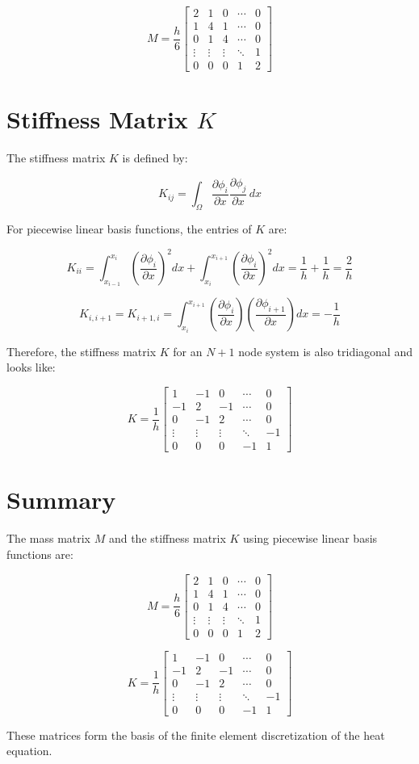 \documentclass{article}
\begin{document}
\[
M = \frac{h}{6}
\begin{bmatrix}
2 & 1 & 0 & \cdots & 0 \\
1 & 4 & 1 & \cdots & 0 \\
0 & 1 & 4 & \cdots & 0 \\
\vdots & \vdots & \vdots & \ddots & 1 \\
0 & 0 & 0 & 1 & 2
\end{bmatrix}
\]

\section*{Stiffness Matrix \(K\)}
The stiffness matrix \(K\) is defined by:

\[
K_{ij} = \int_{\Omega} \frac{\partial \phi_i}{\partial x} \frac{\partial \phi_j}{\partial x} \, dx
\]

For piecewise linear basis functions, the entries of \(K\) are:

\[
K_{ii} = \int_{x_{i-1}}^{x_i} \left( \frac{\partial \phi_i}{\partial x} \right)^2 dx + \int_{x_i}^{x_{i+1}} \left( \frac{\partial \phi_i}{\partial x} \right)^2 dx = \frac{1}{h} + \frac{1}{h} = \frac{2}{h}
\]

\[
K_{i,i+1} = K_{i+1,i} = \int_{x_i}^{x_{i+1}} \left( \frac{\partial \phi_i}{\partial x} \right) \left( \frac{\partial \phi_{i+1}}{\partial x} \right) dx = -\frac{1}{h}
\]

Therefore, the stiffness matrix \(K\) for an \(N+1\) node system is also tridiagonal and looks like:

\[
K = \frac{1}{h}
\begin{bmatrix}
1 & -1 & 0 & \cdots & 0 \\
-1 & 2 & -1 & \cdots & 0 \\
0 & -1 & 2 & \cdots & 0 \\
\vdots & \vdots & \vdots & \ddots & -1 \\
0 & 0 & 0 & -1 & 1
\end{bmatrix}
\]

\section*{Summary}
The mass matrix \(M\) and the stiffness matrix \(K\) using piecewise linear basis functions are:

\[
M = \frac{h}{6}
\begin{bmatrix}
2 & 1 & 0 & \cdots & 0 \\
1 & 4 & 1 & \cdots & 0 \\
0 & 1 & 4 & \cdots & 0 \\
\vdots & \vdots & \vdots & \ddots & 1 \\
0 & 0 & 0 & 1 & 2
\end{bmatrix}
\]

\[
K = \frac{1}{h}
\begin{bmatrix}
1 & -1 & 0 & \cdots & 0 \\
-1 & 2 & -1 & \cdots & 0 \\
0 & -1 & 2 & \cdots & 0 \\
\vdots & \vdots & \vdots & \ddots & -1 \\
0 & 0 & 0 & -1 & 1
\end{bmatrix}
\]

These matrices form the basis of the finite element discretization of the heat equation.
\end{document}
